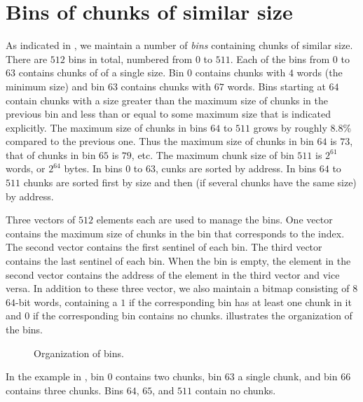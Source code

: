 \section{Bins of chunks of similar size}
\label{sec-memory-allocator-bins-of-chunks}

As indicated in
, we maintain
a number of \emph{bins} containing chunks of similar size.  There are
$512$ bins in total, numbered from $0$ to $511$.  Each of the bins
from $0$ to $63$ contains chunks of of a single size.  Bin $0$
contains chunks with $4$ words (the minimum size) and bin $63$
contains chunks with $67$ words.  Bins starting at $64$ contain chunks
with a size greater than the maximum size of chunks in the previous
bin and less than or equal to some maximum size that is indicated
explicitly.  The maximum size of chunks in bins $64$ to $511$ grows by
roughly $8.8$\% compared to the previous one.  Thus the maximum size
of chunks in bin $64$ is $73$, that of chunks in bin $65$ is $79$,
etc.  The maximum chunk size of bin $511$ is $2^{61}$ words, or
$2^{64}$ bytes.  In bins $0$ to $63$, cunks are sorted by address.  In
bins $64$ to $511$ chunks are sorted first by size and then (if
several chunks have the same size) by address.

Three vectors of $512$ elements each are used to manage the bins.  One
vector contains the maximum size of chunks in the bin that corresponds
to the index.  The second vector contains the first sentinel of each
bin.  The third vector contains the last sentinel of each bin.  When
the bin is empty, the element in the second vector contains the
address of the element in the third vector and vice versa.  In
addition to these three vector, we also maintain a bitmap consisting
of $8$ $64$-bit words, containing a $1$ if the corresponding bin has
at least one chunk in it and $0$ if the corresponding bin contains no
chunks.   illustrates the organization of the bins.

\begin{figure}
\begin{center}
\end{center}
\caption{\label{fig-bins}
Organization of bins.}
\end{figure}

In the example in , bin $0$ contains two chunks, bin
$63$ a single chunk, and bin $66$ contains three chunks.  Bins $64$,
$65$, and $511$ contain no chunks.

